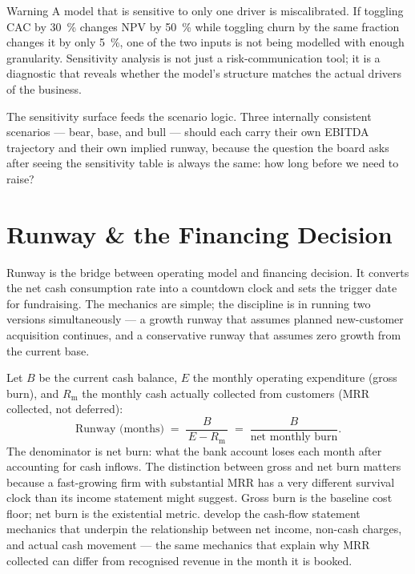 \begin{admonition}{Warning}
A model that is sensitive to only one driver is miscalibrated. If toggling CAC by
\qty{30}{\percent} changes NPV by \qty{50}{\percent} while toggling churn by the same
fraction changes it by only \qty{5}{\percent}, one of the two inputs is not being modelled with
enough granularity. Sensitivity analysis is not just a risk-communication tool; it is a
diagnostic that reveals whether the model's structure matches the actual drivers of the
business.
\end{admonition}

The sensitivity surface feeds the scenario logic. Three internally consistent scenarios ---
bear, base, and bull --- should each carry their own EBITDA trajectory and their own implied
runway, because the question the board asks after seeing the sensitivity table is always the
same: how long before we need to raise?


\section{Runway \& the Financing Decision}\label{sec:runway}

Runway is the bridge between operating model and financing decision. It converts the net cash
consumption rate into a countdown clock and sets the trigger date for fundraising. The
mechanics are simple; the discipline is in running two versions simultaneously --- a growth
runway that assumes planned new-customer acquisition continues, and a conservative runway that
assumes zero growth from the current base.

Let $B$ be the current cash balance, $E$ the monthly operating expenditure (gross burn), and
$R_{\mathrm{m}}$ the monthly cash actually collected from customers (MRR collected, not
deferred):
\begin{equation}\label{eq:runway}
  \text{Runway (months)}
  \;=\;
  \frac{B}{\,E - R_{\mathrm{m}}\,}
  \;=\;
  \frac{B}{\text{net monthly burn}}.
\end{equation}
The denominator is net burn: what the bank account loses each month after accounting for cash
inflows. The distinction between gross and net burn matters because a fast-growing firm with
substantial MRR has a very different survival clock than its income statement might suggest.
Gross burn is the baseline cost floor; net burn is the existential metric.
\textcite{brealey2020} develop the cash-flow statement mechanics that underpin the relationship
between net income, non-cash charges, and actual cash movement --- the same mechanics that
explain why MRR collected can differ from recognised revenue in the month it is booked.

